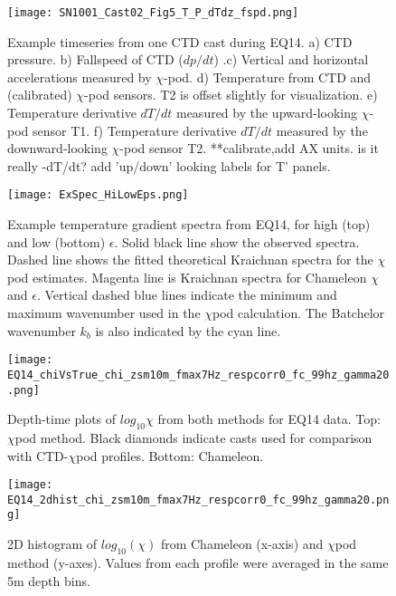 \documentclass{ametsoc}
\begin{document}

\begin{figure}[t]
  \noindent\texttt{[image: SN1001\_Cast02\_Fig5\_T\_P\_dTdz\_fspd.png]}\\
  \caption{Example timeseries from one CTD cast during EQ14. a) CTD pressure. b) Fallspeed of CTD ($dp/dt$) .c) Vertical and horizontal accelerations measured by $\chi$-pod. d) Temperature from CTD and (calibrated) $\chi$-pod sensors. T2 is offset slightly for visualization. e) Temperature derivative $dT/dt$ measured by the upward-looking $\chi$-pod sensor T1. f) Temperature derivative $dT/dt$ measured by the downward-looking $\chi$-pod sensor T2. **calibrate,add AX units. is it really -dT/dt? add 'up/down' looking labels for T' panels.}
  \label{f2}
\end{figure}



\begin{figure}[t]
  \noindent\texttt{[image: ExSpec\_HiLowEps.png]}\\
  \caption{Example temperature gradient spectra from EQ14, for high (top) and low (bottom) $\epsilon$. Solid black line show the observed spectra. Dashed line shows the fitted theoretical Kraichnan spectra for the $\chi$pod estimates. Magenta line is Kraichnan spectra for Chameleon $\chi$ and $\epsilon$. Vertical dashed blue lines indicate the minimum and maximum wavenumber used in the $\chi$pod calculation. The Batchelor wavenumber $k_b$ is also indicated by the cyan line.}
  \label{specexamp}
\end{figure}


\begin{figure}[t]
  \noindent\texttt{[image: EQ14\_chiVsTrue\_chi\_zsm10m\_fmax7Hz\_respcorr0\_fc\_99hz\_gamma20.png]}\\
  \caption{Depth-time plots of $log_{10}\chi$ from both methods for EQ14 data. Top: $\chi$pod method. Black diamonds indicate casts used for comparison with CTD-$\chi$pod profiles. Bottom: Chameleon.}
  \label{eq14_eps_pcolor}
\end{figure}


\begin{figure}[t]
  \noindent\texttt{[image: EQ14\_2dhist\_chi\_zsm10m\_fmax7Hz\_respcorr0\_fc\_99hz\_gamma20.png]}\\
  \caption{2D histogram of $log_{10}(\chi)$ from Chameleon (x-axis) and $\chi$pod method (y-axes). Values from each profile were averaged in the same 5m depth bins. }
  \label{eq14_chi_2dhist}
\end{figure}
\end{document}
